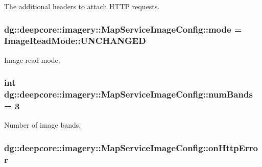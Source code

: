 The additional headers to attach H\+T\+TP requests. 

\subsubsection[{\texorpdfstring{mode}{mode}}]{ dg\+::deepcore\+::imagery\+::\+Map\+Service\+Image\+Config\+::mode = {\bf Image\+Read\+Mode\+::\+U\+N\+C\+H\+A\+N\+G\+ED}}\hypertarget{structdg_1_1deepcore_1_1imagery_1_1_map_service_image_config_a889a9ec30f6e9aa31a2a02058b2e5598}{}\label{structdg_1_1deepcore_1_1imagery_1_1_map_service_image_config_a889a9ec30f6e9aa31a2a02058b2e5598}


Image read mode. 

\subsubsection[{\texorpdfstring{num\+Bands}{numBands}}]{\setlength{\rightskip}{0pt plus 5cm}int dg\+::deepcore\+::imagery\+::\+Map\+Service\+Image\+Config\+::num\+Bands = 3}\hypertarget{structdg_1_1deepcore_1_1imagery_1_1_map_service_image_config_a99145c60c1dc8f223224c14b6552e466}{}\label{structdg_1_1deepcore_1_1imagery_1_1_map_service_image_config_a99145c60c1dc8f223224c14b6552e466}


Number of image bands. 

\subsubsection[{\texorpdfstring{on\+Http\+Error}{onHttpError}}]{ dg\+::deepcore\+::imagery\+::\+Map\+Service\+Image\+Config\+::on\+Http\+Error}\hypertarget{structdg_1_1deepcore_1_1imagery_1_1_map_service_image_config_ac6a961645bdaf41194bda398c74bb701}{}\label{structdg_1_1deepcore_1_1imagery_1_1_map_service_image_config_ac6a961645bdaf41194bda398c74bb701}


